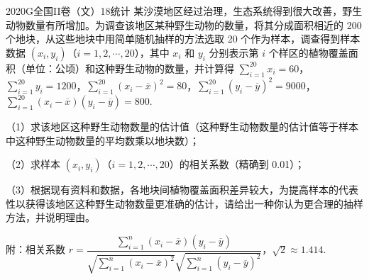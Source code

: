 
\begin{problem}{2020}{G}{全国II卷（文）}{18}{统计}
某沙漠地区经过治理，生态系统得到很大改善，野生动物数量有所增加。为调查该地区某种野生动物的数量，将其分成面积相近的 200 个地块，从这些地块中用简单随机抽样的方法选取 20 个作为样本，调查得到样本数据 $ (x_i,y_i) $（$ i=1,2,\cdots,20 $），其中 $ x_i $ 和 $ y_i $ 分别表示第 $ i $ 个样区的植物覆盖面积（单位：公顷）和这种野生动物的数量，并计算得 $ \displaystyle\sum_{i=1}^{20}x_i=60 $，$ \displaystyle\sum_{i=1}^{20}y_i=1200 $，$ \displaystyle\sum_{i=1}^{20}(x_i-\overline{x})^2=80 $，$ \displaystyle\sum_{i=1}^{20}(y_i-\overline{y})^2=9000 $，$ \displaystyle\sum_{i=1}^{20}(x_i-\overline{x})(y_i-\overline{y})=800 $.

（1）求该地区这种野生动物数量的估计值（这种野生动物数量的估计值等于样本中这种野生动物数量的平均数乘以地块数）；

（2）求样本 $ (x_i,y_i) $（$ i=1,2,\cdots,20 $）的相关系数（精确到 0.01）；

（3）根据现有资料和数据，各地块间植物覆盖面积差异较大，为提高样本的代表性以获得该地区这种野生动物数量更准确的估计，请给出一种你认为更合理的抽样方法，并说明理由。

附：相关系数 $ r=\dfrac{\displaystyle\sum_{i=1}^{n}(x_i-\overline{x})(y_i-\overline{y})}{\sqrt{\displaystyle\sum_{i=1}^{n}(x_i-\overline{x})^2}\sqrt{\displaystyle\sum_{i=1}^{n}(y_i-\overline{y})^2}} $，$ \sqrt{2}\approx 1.414 $.
\end{problem}

\begin{answer}

\end{answer}

\begin{solutions}

\end{solutions}